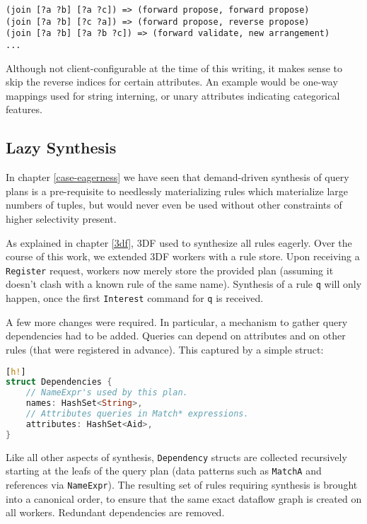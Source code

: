 \documentclass[../index.tex]{subfiles}
\begin{document}
\begin{verbatim}
(join [?a ?b] [?a ?c]) => (forward propose, forward propose)
(join [?a ?b] [?c ?a]) => (forward propose, reverse propose)
(join [?a ?b] [?a ?b ?c]) => (forward validate, new arrangement)
...
\end{verbatim}

Although not client-configurable at the time of this writing, it makes
sense to skip the reverse indices for certain attributes. An example
would be one-way mappings used for string interning, or unary
attributes indicating categorical features.

\subsection{Lazy Synthesis} \label{lazy-synthesis}

In chapter \ref{case-eagerness} we have seen that demand-driven
synthesis of query plans is a pre-requisite to needlessly
materializing rules which materialize large numbers of tuples, but
would never even be used without other constraints of higher
selectivity present.

As explained in chapter \ref{3df}, 3DF used to synthesize all rules
eagerly. Over the course of this work, we extended 3DF workers with a
rule store. Upon receiving a \texttt{Register} request, workers now
merely store the provided plan (assuming it doesn't clash with a known
rule of the same name). Synthesis of a rule \texttt{q} will only
happen, once the first \texttt{Interest} command for \texttt{q} is
received.

A few more changes were required. In particular, a mechanism to gather
query dependencies had to be added. Queries can depend on attributes
and on other rules (that were registered in advance). This captured by
a simple struct:

\begin{lstlisting}[language=Rust, style=colouredRust][h!]
struct Dependencies {
    // NameExpr's used by this plan.
    names: HashSet<String>,
    // Attributes queries in Match* expressions.
    attributes: HashSet<Aid>,
}
\end{lstlisting}

Like all other aspects of synthesis, \texttt{Dependency} structs are
collected recursively starting at the leafs of the query plan (data
patterns such as \texttt{MatchA} and references via
\texttt{NameExpr}). The resulting set of rules requiring synthesis is
brought into a canonical order, to ensure that the same exact dataflow
graph is created on all workers. Redundant dependencies are removed.
\end{document}
